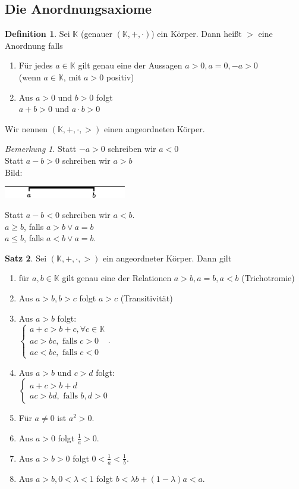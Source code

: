 \documentclass[12pt,a4paper,titlepage]{article} %
\theoremstyle{definition}
\newtheorem{satz}{Satz}[subsection]
\newtheorem{defi}[satz]{Definition}
\theoremstyle{remark}
\newtheorem*{bem}{Bemerkung}
\begin{document}
\subsection{Die Anordnungsaxiome}
\begin{defi} %
	Sei $\mathbb{K}$ (genauer $(\mathbb{K},+,\cdot)$) ein Körper. Dann heißt $>$ eine Anordnung falls
	\begin{enumerate}
		\item Für jedes $a\in\mathbb{K}$ gilt genau eine der Aussagen $a>0,a=0,-a>0$\\
		(wenn $a\in\mathbb{K}$, mit $a>0$ positiv)
		\item Aus $a>0$ und $b>0$ folgt\\
		$a+b>0$ und $a\cdot b>0$
	\end{enumerate}
	Wir nennen $(\mathbb{K},+,\cdot,>)$ einen angeordneten Körper.
\end{defi}
\begin{bem}
	Statt $-a>0$ schreiben wir $a<0$\\
	Statt $a-b>0$ schreiben wir $a>b$\\
	Bild:
	\begin{center}
		\includegraphics[width=0.4\textwidth]{images/img02.png}
	\end{center}
	Statt $a-b<0$ schreiben wir $a<b$.\\
	$a \geq b$, falls $a>b \vee a=b$\\
	$a \leq b$, falls $a<b \vee a=b$.
\end{bem}
\begin{satz}
	Sei $(\mathbb{K}, +,\cdot, >)$ ein angeordneter Körper. Dann gilt
	\begin{enumerate}
		\item für $a,b\in\mathbb{K}$ gilt genau eine der Relationen $a>b, a=b, a<b$ (Trichotromie)
		\item Aus $a>b, b>c$ folgt $a>c$ (Transitivität)
		\item Aus $a>b$ folgt:\\
		$\begin{cases}
			a+c>b+c, \forall c\in\mathbb{K}\\
			ac>bc, \text{ falls } c>0\\
			ac<bc, \text{ falls } c<0
		\end{cases}$.
		\item Aus $a>b$ und $c>d$ folgt:\\
		$\begin{cases}
			a+c>b+d\\
			ac>bd, \text{ falls } b,d>0 %
		\end{cases}$
		\item Für $a\neq 0$ ist $a^2 >0$.
		\item Aus $a>0$ folgt $\frac{1}{a}>0$.
		\item Aus $a>b>0$ folgt $0<\frac{1}{a}<\frac{1}{b}$.
		\item Aus $a>b, 0<\lambda<1$ folgt $b<\lambda b + (1-\lambda)a<a$.
	\end{enumerate}
\end{satz}
\end{document}
